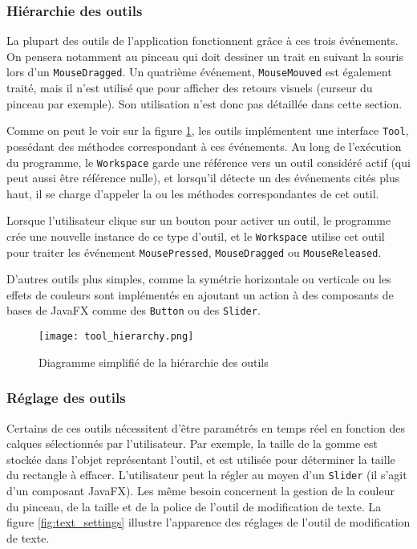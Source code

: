 \subsubsection{Hiérarchie des outils}
\label{section_outils}
\par
La plupart des outils de l'application  fonctionnent grâce à ces trois événements. On pensera notamment au pinceau qui doit dessiner un trait en suivant la souris lors d'un \texttt{MouseDragged}. Un quatrième événement, \texttt{MouseMouved} est également traité, mais il n'est utilisé que pour afficher des retours visuels (curseur du pinceau par exemple). Son utilisation n'est donc pas détaillée dans cette section.
\par
Comme on peut le voir sur la figure \ref{fig:tool_hier}, les outils implémentent une interface \texttt{Tool}, possédant des méthodes correspondant à ces événements. Au long de l'exécution du programme, le \texttt{Workspace} garde une référence vers un outil considéré actif (qui peut aussi être référence nulle), et lorsqu'il détecte un des événements cités plus haut, il se charge d'appeler la ou les méthodes correspondantes de cet outil.
\par
Lorsque l'utilisateur clique sur un bouton pour activer un outil, le programme crée une nouvelle instance de ce type d'outil, et le \texttt{Workspace} utilise cet outil pour traiter les événement \texttt{MousePressed}, \texttt{MouseDragged} ou \texttt{MouseReleased}.
\par
D'autres outils plus simples, comme la symétrie horizontale ou verticale ou les effets de couleurs sont implémentés en ajoutant un action à des composants de bases de JavaFX comme des \texttt{Button} ou des \texttt{Slider}.

\begin{figure}[H]
	\caption{Diagramme simplifié de la hiérarchie des outils}
	\centering
	\texttt{[image: tool\_hierarchy.png]}
	\label{fig:tool_hier}
\end{figure}

\subsubsection{Réglage des outils} \label{reglage-outils}
Certains de ces outils nécessitent d'être paramétrés en temps réel en fonction des calques sélectionnés par l'utilisateur. Par exemple, la taille de la gomme est stockée dans l'objet représentant l'outil, et est utilisée pour déterminer la taille du rectangle à effacer. L'utilisateur peut la régler au moyen d'un \texttt{Slider} (il s'agit d'un composant JavaFX). Les même besoin concernent la gestion de la couleur du pinceau, de la taille et de la police de l'outil de modification de texte. La figure \ref{fig:text_settings} illustre l'apparence des réglages de l'outil de modification de texte.

